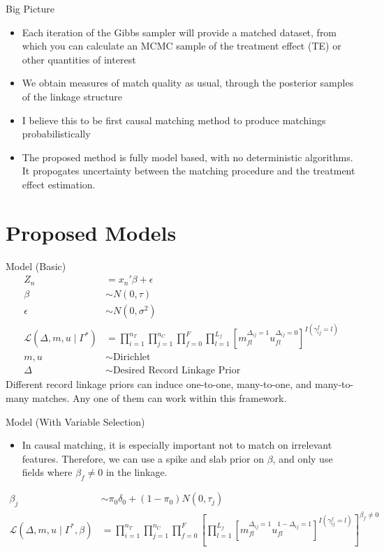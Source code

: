 \documentclass{beamer}
\begin{document}
\begin{frame}{Big Picture}
	\begin{itemize}
		\item Each iteration of the Gibbs sampler will provide a matched dataset, from which you can calculate an MCMC sample of the treatment effect (TE) or other quantities of interest
		\item We obtain measures of match quality as usual, through the posterior samples of the linkage structure
		\item I believe this to be first causal matching method to produce matchings probabilistically
		\item The proposed method is fully model based, with no deterministic algorithms. It propogates uncertainty between the matching procedure and the treatment effect estimation. 
	\end{itemize}
\end{frame}

\section{Proposed Models}

\begin{frame}{Model (Basic)}
	\begin{align*}
		Z_n &= x_n' \beta + \epsilon \\
		\beta &\sim N(0, \tau) \\
		\epsilon &\sim N(0, \sigma^2) \\
	\mathcal{L}(\Delta, m, u \mid \Gamma^{*}) &= \prod_{i=1}^{n_T}  \prod_{j=1}^{n_C}\prod_{f=0}^{F}\prod_{l=1}^{L_f}\left[  m_{fl}^{\Delta_{ij} = 1}u_{fl}^{\Delta_{ij} = 0}\right]^{I(\gamma_{ij}^f = l)} \\
		m, u &\sim \text{Dirichlet} \\
		\Delta &\sim \text{Desired Record Linkage Prior}
	\end{align*}
Different record linkage priors can induce one-to-one, many-to-one, and many-to-many matches. Any one of them can work within this framework. 
\end{frame}

\begin{frame}{Model (With Variable Selection)}
	\begin{itemize}
		\item In causal matching, it is especially important not to match on irrelevant features. Therefore, we can use a spike and slab prior on $\beta$, and only use fields where $\beta_f \neq 0$ in the linkage.
	\end{itemize}
\begin{align*}
	\beta_j & \sim \pi_0 \delta_0 + (1 - \pi_0)N(0, \tau_j) \\
	\mathcal{L}(\Delta, m, u \mid \Gamma^{*}, \beta) &= 
	\prod_{i=1}^{n_T}  \prod_{j=1}^{n_C}\prod_{f=0}^{F}\left[\prod_{l=1}^{L_f}\left[  m_{fl}^{\Delta_{ij} = 1}u_{fl}^{1 - \Delta_{ij} = 1}\right]^{I(\gamma_{ij}^f = l)}\right]^{\beta_f \neq 0} \\
\end{align*}
\end{frame}
\end{document}
